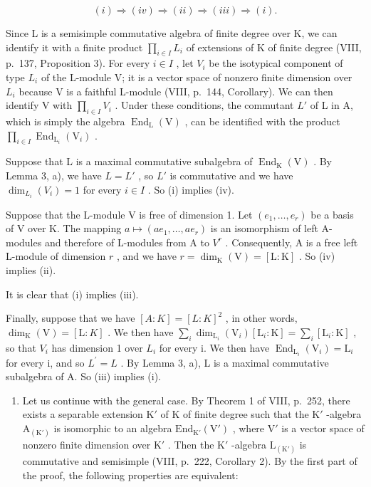 \[
(i) \Longrightarrow (i v) \Longrightarrow (i i) \Longrightarrow (i i i) \Longrightarrow (i).
\]

Since L is a semisimple commutative algebra of finite degree over K, we can identify it with a finite product \(\prod_{i\in I}L_{i}\) of extensions of K of finite degree (VIII, p.~137, Proposition 3). For every \(i\in I\) , let \(V_{i}\) be the isotypical component of type \(L_{i}\) of the L-module V; it is a vector space of nonzero finite dimension over \(L_{i}\) because V is a faithful L-module (VIII, p.~144, Corollary). We can then identify V with \(\prod_{i\in I}V_{i}\) . Under these conditions, the commutant \(L'\) of L in A, which is simply the algebra \(\operatorname{End}_{\mathrm{L}}(\mathrm{V})\) , can be identified with the product \(\prod_{i\in I}\operatorname{End}_{\mathrm{L}_{i}}(\mathrm{V}_{i})\) .

Suppose that L is a maximal commutative subalgebra of \(\operatorname{End}_{\mathrm{K}}(\mathrm{V})\) . By Lemma 3, a), we have \(L = L'\) , so \(L'\) is commutative and we have \(\dim_{L_i}(V_i) = 1\) for every \(i \in I\) . So (i) implies (iv).

Suppose that the L-module V is free of dimension 1. Let \((e_{1},\ldots,e_{r})\) be a basis of V over K. The mapping \(a\mapsto(ae_{1},\ldots,ae_{r})\) is an isomorphism of left A-modules and therefore of L-modules from A to \(V^{r}\) . Consequently, A is a free left L-module of dimension \(r\) , and we have \(r = \dim_{\mathrm{K}}(\mathrm{V}) = [\mathrm{L}:\mathrm{K}]\) . So (iv) implies (ii).

It is clear that (i) implies (iii).

Finally, suppose that we have \([A:K]=[L:K]^{2}\) , in other words, \(\dim_{\mathrm{K}}(\mathrm{V})=[\mathrm{L}:K]\) . We then have \(\sum_{i}\dim_{\mathrm{L}_{i}}(\mathrm{V}_{i})[\mathrm{L}_{i}:\mathrm{K}]=\sum_{i}[\mathrm{L}_{i}:\mathrm{K}]\) , so that \(V_{i}\) has dimension 1 over \(L_{i}\) for every i. We then have \(\operatorname{End}_{\mathrm{L}_{i}}(\mathrm{V}_{i})=\mathrm{L}_{i}\) for every i, and so \(L^{\prime}=L\) . By Lemma 3, a), L is a maximal commutative subalgebra of A. So (iii) implies (i).

\begin{enumerate}
\def\labelenumi{\Alph{enumi})}
\setcounter{enumi}{1}
\tightlist
\item
  Let us continue with the general case. By Theorem 1 of VIII, p.~252, there exists a separable extension \(\mathrm{K}'\) of \(\mathrm{K}\) of finite degree such that the \(\mathrm{K}'\) -algebra \(\mathrm{A}_{(\mathrm{K}')}\) is isomorphic to an algebra \(\mathrm{End}_{\mathrm{K}'}(\mathrm{V}')\) , where \(\mathrm{V}'\) is a vector space of nonzero finite dimension over \(\mathrm{K}'\) . Then the \(\mathrm{K}'\) -algebra \(\mathrm{L}_{(\mathrm{K}')}\) is commutative and semisimple (VIII, p.~222, Corollary 2). By the first part of the proof, the following properties are equivalent:
\end{enumerate}

